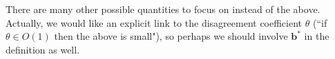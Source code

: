 \documentclass{article}
\newcommand{\vb}{\mathbf{b}}
\newcommand{\vzero}{\mathbf{0}}
\DeclareMathOperator*{\argmin}{arg\,min}
\newcommand{\lrb}[1]{\left[#1\right]}
\begin{document}
There are many other possible quantities to focus on instead of the above. 
Actually, we would like an explicit link to the disagreement coefficient $\theta$
(``if $\theta \in O(1)$ then the above is small"), 
so perhaps we should involve $\vb^*$ in the definition as well.






%


%
%


\end{document}
